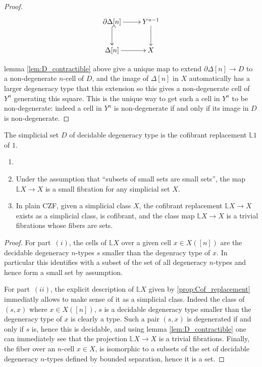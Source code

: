 \documentclass[reqno,10pt,a4paper,oneside,draft]{amsart}
\begin{document}
\begin{proof}
\[ \xymatrix{\partial \Delta[n]  \ar[r] \ar@{^{(}->}[d] & Y^{n-1} \ar[d] \\ \Delta[n]  \ar[r] & X} \]

lemma \ref{lem:D_contractible} above give a unique map to extend $\partial \Delta[n] \rightarrow D$ to a non-degenerate $n$-cell of $D$, and the image of $\Delta[n]$ in $X$ automatically has a larger degeneracy type that this extension so this gives a non-degenerate cell of $Y^{n}$ generating this square. This is the unique way to get such a cell in $Y^n$ to be non-degenerate: indeed a cell in $Y^n$ is non-degenerate if and only if its image in $D$ is non-degenerate.
\end{proof}


\begin{corollary}
The simplicial set $D$ of decidable degeneracy type is the cofibrant replacement $\mathbb{L} 1$ of $1$.
\end{corollary}

\begin{corollary} \label{cor:cofibrant_smallness}
\begin{enumerate}[$(i)$]

\item[]
 
\item Under the assumption that ``subsets of small sets are small sets'', the map $\mathbb{L} X \rightarrow X$ is a small fibration for any simplicial set $X$.

\item In plain CZF, given a simplicial class $X$, the cofibrant replacement $\mathbb{L} X \rightarrow X$ exists as a simplicial class, is cofibrant, and the class map $\mathbb{L} X \rightarrow X$ is a trivial fibrations whose fibers are sets.

\end{enumerate}
\end{corollary}

\begin{proof}

For part~$(i)$, the cells of $\mathbb{L} X$ over a given cell $x \in X([n])$ are the decidable degeneracy $n$-types $s$ smaller than the degenracy type of $x$. In particular this identifies with a subset of the set of all degeneracy $n$-types and hence form a small set by assumption.

For part~$(ii)$, the explicit description of $\mathbb{L} X$ given by \cref{prop:Cof_replacement} immediatly allows to make sense of it as a simplicial class. Indeed the class of $(s,x)$ where $x\in X([n])$, $s$ is a decidable degeneracy type smaller than the degeneracy type of $x$ is clearly a type. Such a pair $(s,x)$ is degenerated if and only if $s$ is, hence this is decidable, and using lemma \ref{lem:D_contractible} one can immediately see that the projection $\mathbb{L} X \rightarrow X$ is a trivial fibrations. Finally, the fiber over an $n$-cell $x \in X$, is isomorphic to a subsets of the set of decidable degeneracy $n$-types defined by bounded separation, hence it is a set.

\end{proof}





\end{document}
